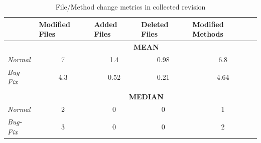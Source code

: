 \begin{table}[H]
	\centering
	\caption{File/Method change metrics in collected revision}
	\label{rev_files}
	\begin{tabular}{@{}lcccc@{}}
		\toprule
		& \multicolumn{1}{l}{\textbf{Modified Files}} & \multicolumn{1}{l}{\textbf{Added Files}} & \multicolumn{1}{l}{\textbf{Deleted Files}} & \multicolumn{1}{l}{\textbf{Modified Methods}} \\ \midrule
		& \multicolumn{4}{c}{\textbf{MEAN}}                                                                                                                                                   \\
		\textit{Normal}  & 7                                           & 1.4                                      & 0.98                                       & 6.8                                           \\
		\textit{Bug-Fix} & 4.3                                         & 0.52                                     & 0.21                                       & 4.64                                          \\
		& \multicolumn{1}{l}{}                        & \multicolumn{1}{l}{}                     & \multicolumn{1}{l}{}                       & \multicolumn{1}{l}{}                          \\
		& \multicolumn{4}{c}{\textbf{MEDIAN}}                                                                                                                                                 \\
		\textit{Normal}  & 2                                           & 0                                        & 0                                          & 1                                             \\
		\textit{Bug-Fix} & 3                                           & 0                                        & 0                                          & 2                                             \\ \bottomrule
	\end{tabular}
\end{table}

